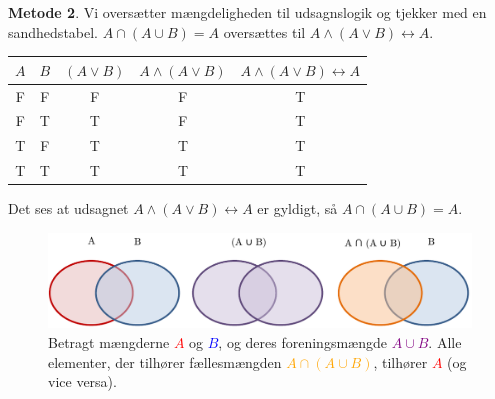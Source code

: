 \begin{enumerate}
    \textbf{Metode 2}. Vi oversætter mængdeligheden til udsagnslogik og tjekker med en sandhedstabel. $A \cap ( A \cup B) = A$ oversættes til $A \land (A \lor B) \leftrightarrow A$.
    
    \begin{table}[H]
\centering
\begin{tabular}{c|c|c|c|c}
$A$ & $B$ & $(A \lor B)$ & $A \land (A \lor B)$ & $ A \land (A \lor B) \leftrightarrow A$ \\ \hline
F & F & F & F & T \\
F & T & T & F & T \\
T & F & T & T & T \\
T & T & T & T & T \\
\end{tabular}
\end{table}
    
Det ses at udsagnet $A \land (A \lor B) \leftrightarrow A$ er gyldigt, så $A \cap ( A \cup B) = A$.
    
    
\end{enumerate}

\begin{figure}[H]
    \centering
    \includegraphics[width=1.0\textwidth]{opgF/F3.pdf}
    \caption{Betragt mængderne  \textcolor{red}{$A$} og \textcolor{blue}{$B$}, og deres foreningsmængde \textcolor{purple}{$A \cup B$}. Alle elementer, der tilhører fællesmængden \textcolor{orange}{$A \cap ( A \cup B)$}, tilhører \textcolor{red}{$A$} (og vice versa).}
    \label{fig:F3}
\end{figure}

